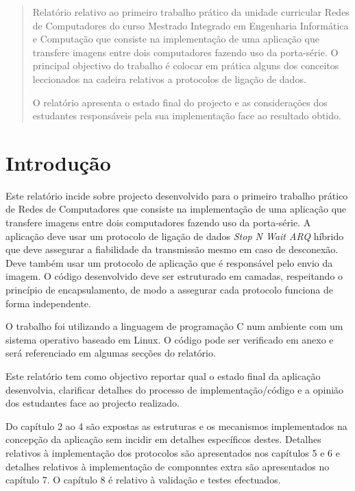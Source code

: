 \documentclass[11pt,a4paper,reqno]{report}
\numberwithin{equation}{section}
\begin{document}



\begin{abstract}
	
Relatório relativo ao primeiro trabalho prático da unidade curricular Redes de Computadores do curso Mestrado Integrado em Engenharia Informática e Computação que consiste na implementação de uma aplicação que transfere imagens entre dois computadores fazendo uso da porta-série. O principal  objectivo do trabalho é colocar em prática  alguns dos conceitos leccionados na cadeira relativos a protocolos de ligação de dados.

O relatório apresenta o estado final do projecto e as considerações dos estudantes responsáveis pela sua implementação face ao resultado obtido.

\end{abstract}

\tableofcontents

\chapter{Introdução}

Este relatório incide sobre projecto desenvolvido para o primeiro trabalho prático de Redes de Computadores que consiste na implementação de uma aplicação que transfere imagens entre dois computadores fazendo uso da porta-série. A aplicação deve usar um protocolo de ligação de dados \emph{Stop N Wait ARQ} híbrido que deve assegurar a fiabilidade  da transmissão mesmo em caso de desconexão. Deve também usar um protocolo de aplicação que é responsável pelo envio da imagem. O código desenvolvido deve ser estruturado em camadas, respeitando o princípio de encapsulamento, de modo a assegurar cada protocolo funciona de forma independente.
	
	O trabalho foi utilizando a linguagem de programação C num ambiente com um sistema operativo baseado em Linux. O código pode ser verificado em anexo e será referenciado em algumas secções do relatório.
	
	Este relatório tem como objectivo reportar qual o estado final da aplicação desenvolvia, clarificar detalhes do processo de implementação/código e a opinião dos estudantes face ao projecto realizado.
	
	Do capítulo 2 ao 4 são expostas as estruturas e os mecanismos implementados na concepção da aplicação sem incidir em detalhes específicos destes.
	Detalhes relativos à implementação dos protocolos são apresentados nos capítulos 5 e 6 e detalhes relativos à implementação de componntes extra são apresentados no capítulo 7.
	O capítulo 8 é relativo à validação e testes efectuados.
	
\end{document}

